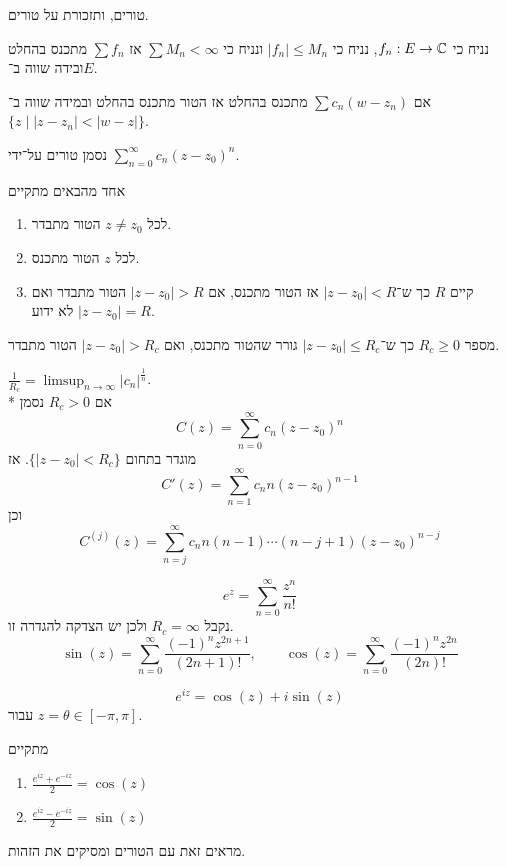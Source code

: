 טורים, ותזכורת על טורים.
\begin{theorem}[M test]
	נניח כי $f_n : E \to \mathbb{C}$, נניח כי $|f_n| \le M_n$ ונניח כי $\sum M_n < \infty$ אז $\sum f_n$ מתכנס בהחלט ובידה שווה ב־$E$.
\end{theorem}
\begin{lemma}
	אם $\sum c_n (w - z_n)$ מתכנס בהחלט אז הטור מתכנס בהחלט ובמידה שווה ב־$\{ z \mid |z - z_n| < |w - z| \}$.
\end{lemma}
נסמן טורים על־ידי $\sum_{n = 0}^\infty c_n {(z - z_0)}^n$.
\begin{proposition}
	אחד מהבאים מתקיים
	\begin{enumerate}
		\item לכל $z \ne z_0$ הטור מתבדר.
		\item לכל $z$ הטור מתכנס.
		\item קיים $R$ כך ש־$|z - z_0| < R$ אז הטור מתכנס, אם $|z - z_0| > R$ הטור מתבדר ואם $|z - z_0| = R$ לא ידוע.
	\end{enumerate}
\end{proposition}
\begin{definition}
	מספר $R_c \ge 0$ כך ש־$|z - z_0| \le R_c$ גורר שהטור מתכנס, ואם $|z - z_0| > R_c$ הטור מתבדר.
\end{definition}
\begin{theorem}[הדאמר]
	$\frac{1}{R_c} = \limsup_{n \to \infty} {|c_n|}^\frac{1}{n}$. \\*
	אם $R_c > 0$ נסמן
	\[
		C(z) = \sum_{n = 0}^{\infty} c_n {(z - z_0)}^n
	\]
	מוגדר בתחום $\{ |z - z_0| < R_c \}$.
	אז
	\[
		C'(z) = \sum_{n = 1}^{\infty} c_n n {(z - z_0)}^{n - 1}
	\]
	וכן
	\[
		C^{(j)}(z) = \sum_{n = j}^{\infty} c_n n(n - 1) \cdots (n - j + 1) {(z - z_0)}^{n - j}
	\]
\end{theorem}
\begin{definition}
	\[
		e^z = \sum_{n = 0}^{\infty} \frac{z^n}{n!}
	\]
	נקבל $R_c = \infty$ ולכן יש הצדקה להגדרה זו.
	\[
		\sin(z) = \sum_{n = 0}^{\infty} \frac{{(-1)}^n z^{2n + 1}}{(2n + 1)!},
		\qquad \cos(z) = \sum_{n = 0}^{\infty} \frac{{(-1)}^n z^{2n}}{(2n)!}
	\]
\end{definition}
\begin{proposition}
	\[
		e^{iz} = \cos(z) + i \sin(z)
	\]
	עבור $z = \theta \in [-\pi, \pi]$.
\end{proposition}
\begin{exercise}
	מתקיים
	\begin{enumerate}
		\item $\frac{e^{iz} + e^{-iz}}{2} = \cos(z)$
		\item $\frac{e^{iz} - e^{-iz}}{2} = \sin(z)$
	\end{enumerate}
	מראים זאת עם הטורים ומסיקים את הזהות.
\end{exercise}
